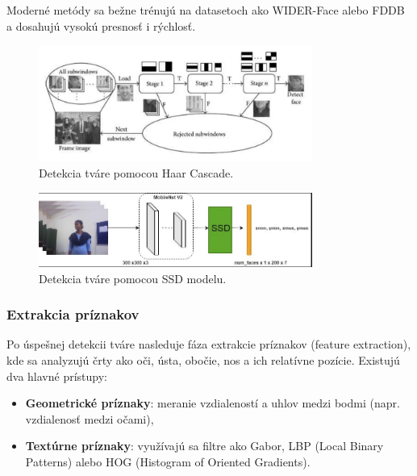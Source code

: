 Moderné metódy sa bežne trénujú na datasetoch ako WIDER-Face alebo FDDB a dosahujú vysokú presnosť i rýchlosť.

\begin{figure}[!htpb]
    \centering
    \includegraphics[width=0.8\textwidth]{img/haar_cascade.png}
    \caption{Detekcia tváre pomocou Haar Cascade.} 
    \label{fig:haar_cascade}
\end{figure}

\begin{figure}[!htpb]
    \centering
    \includegraphics[width=0.8\textwidth]{img/ssd_model.png}
    \caption{Detekcia tváre pomocou SSD modelu.} 
    \label{fig:ssd_model}
\end{figure}
\subsubsection{Extrakcia príznakov}
Po úspešnej detekcii tváre nasleduje fáza extrakcie príznakov (feature extraction), kde sa analyzujú črty ako oči, ústa, obočie, nos a ich relatívne pozície. Existujú dva hlavné prístupy:

\begin{itemize}
    \item \textbf{Geometrické príznaky}: meranie vzdialeností a uhlov medzi bodmi (napr. vzdialenosť medzi očami),
    \item \textbf{Textúrne príznaky}: využívajú sa filtre ako Gabor, LBP (Local Binary Patterns) alebo HOG (Histogram of Oriented Gradients).
\end{itemize}

